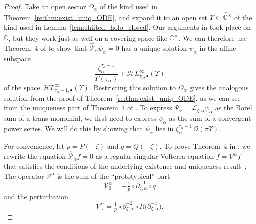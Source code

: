 \documentclass{article}
\newcommand{\singexp}[2]{\mathcal{H}L^\infty_{#1, #2}}
\newcommand{\singexpalg}[1]{\singexp{#1}{\bullet}}
\newcommand{\C}{\mathbb{C}}
\newcommand{\volterra}{\mathcal{V}}
\newcommand{\hardpart}{\mathcal{V}_0}
\newcommand{\softpart}{\mathcal{V}_\star}
\newcommand{\solwhole}{f}
\newcommand{\laplace}{\mathcal{L}}
\theoremstyle{definition}
\theoremstyle{plain}
\begin{document}
\begin{proof}
Take an open sector $\Omega_\alpha$ of the kind used in Theorem~\ref{re:thm:exist_uniq_ODE}, and expand it to an open set $\Upsilon \subset \widetilde{\C^\times}$ of the kind used in Lemma~\ref{lem:shifted_holo_closed}. Our arguments in \cite{reg-sing-volterra} took place on $\C$, but they work just as well on a covering space like $\widetilde{\C^\times}$. We can therefore use Theorem~4 of \cite{reg-sing-volterra} to show that $\hat{\mathcal{P}}_\alpha \psi_\alpha = 0$ has a unique solution $\psi_\alpha$ in the affine subspace 
\[ \frac{\zeta_\alpha^{\tau_\alpha-1}}{\Gamma(\tau_\alpha)} + \singexpalg{\tau_\alpha}(\Upsilon) \]
of the space $\singexpalg{\tau_\alpha-1}(\Upsilon)$. Restricting this solution to $\Omega_\alpha$ gives the analogous solution from the proof of Theorem~\ref{re:thm:exist_uniq_ODE}, as we can see from the uniqueness part of Theorem~4 of \cite{reg-sing-volterra}. To express $\Psi_\alpha = \laplace_{\zeta, \alpha} \psi_\alpha$ as the Borel sum of a trans-monomial, we first need to express $\psi_\alpha$ as the sum of a convergent power series. We will do this by showing that $\psi_\alpha$ lies in $\zeta_\alpha^{\tau_\alpha - 1}\,\mathcal{O}(\pi \Upsilon)$.

For convenience, let $p = P(-\zeta)$ and $q = Q(-\zeta)$. To prove Theorem~4 in \cite{reg-sing-volterra}, we rewrite the equation $\hat{\mathcal{P}}_\alpha \solwhole = 0$ as a regular singular Volterra equation $\solwhole = \volterra^\alpha \solwhole$ that satisfies the conditions of the underlying existence and uniqueness result~\cite[Theorem~3]{reg-sing-volterra}. The operator $\volterra^\alpha$ is the sum of the ``prototypical'' part
\[ \hardpart^\alpha = -\tfrac{1}{p} \circ \partial^{-1}_{\zeta, \alpha} \circ q \]
and the perturbation
\[ \softpart^\alpha = \tfrac{1}{p} \circ \partial^{-2}_{\zeta, \alpha} \circ R\big(\partial^{-1}_{\zeta, \alpha}\big). \]


\end{proof}
\end{document}
